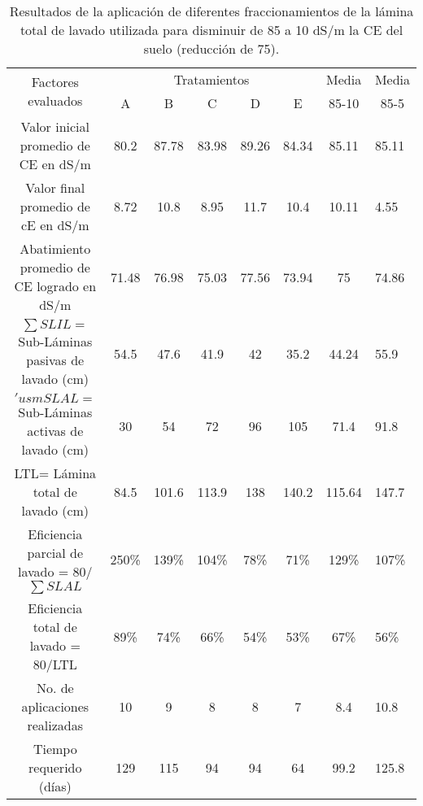 \begin{table}[h!]
    \centering
    \begin{tabular}{@{}cccccccl@{}}
    \toprule
    \multirow{2}{*}{Factores evaluados}           & \multicolumn{5}{c}{Tratamientos}    & Media & \multicolumn{1}{c}{Media} \\ \cmidrule(l){2-8} 
                                                    & A     & B     & C     & D     & E     & 85-10  & \multicolumn{1}{c}{85-5} \\ \midrule
    Valor inicial promedio de CE en dS/m            & 80.2  & 87.78 & 83.98 & 89.26 & 84.34 & 85.11  & 85.11                    \\
    Valor final promedio de cE en dS/m              & 8.72  & 10.8  & 8.95  & 11.7  & 10.4  & 10.11  & 4.55                     \\
    Abatimiento promedio de CE logrado en dS/m      & 71.48 & 76.98 & 75.03 & 77.56 & 73.94 & 75     & 74.86                    \\
    $\sum SLIL=$ Sub-Láminas pasivas de lavado (cm) & 54.5  & 47.6  & 41.9  & 42    & 35.2  & 44.24  & 55.9                     \\
    $'usm SLAL=$ Sub-Láminas activas de lavado (cm) & 30    & 54    & 72    & 96    & 105   & 71.4   & 91.8                     \\
    LTL= Lámina total de lavado (cm)                & 84.5  & 101.6 & 113.9 & 138   & 140.2 & 115.64 & 147.7                    \\
    Eficiencia parcial de lavado = 80/$\sum SLAL$ & 250\% & 139\% & 104\% & 78\% & 71\% & 129\% & 107\%                     \\
    Eficiencia total de lavado = 80/LTL             & 89\%  & 74\%  & 66\%  & 54\%  & 53\%  & 67\%   & 56\%                     \\
    No. de aplicaciones realizadas                  & 10    & 9     & 8     & 8     & 7     & 8.4    & 10.8                     \\
    Tiempo requerido (días)                         & 129   & 115   & 94    & 94    & 64    & 99.2   & 125.8                    \\ \bottomrule
    \end{tabular}
    \caption{Resultados de la aplicación de diferentes fraccionamientos de la lámina total de lavado utilizada para disminuir de 85 a 10 dS/m la CE del suelo (reducción de 75).}
    \label{tabsa37}
\end{table}
